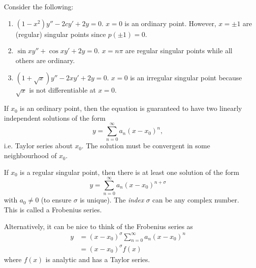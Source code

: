\documentclass[a4paper]{article}
\begin{document}
\begin{eg}
  Consider the following:
  \begin{enumerate}
  \item $(1 - x^2)y'' - 2cy' + 2y = 0$. $x = 0$ is an ordinary point. However, $x = \pm 1$ are (regular) singular points since $p(\pm 1) = 0$.
  \item $\sin x y'' + \cos x y' + 2y = 0$. $x = n\pi$ are regular singular points while all others are ordinary.
  \item $(1 + \sqrt{x}) y'' - 2xy' + 2y = 0$. $x = 0$ is an irregular singular point because $\sqrt{x}$ is not differentiable at $x = 0$.
  \end{enumerate}
\end{eg}

If $x_0$ is an ordinary point, then the equation is guaranteed to have two linearly independent solutions of the form 
\[
y = \sum_{n = 0}^\infty a_n(x - x_0)^n,
\]
i.e. Taylor series about $x_0$. The solution must be convergent in some neighbourhood of $x_0$.

If $x_0$ is a regular singular point, then there is at least one solution of the form 
\[
y = \sum_{n = 0}^\infty a_n(x - x_0)^{n + \sigma}
\]
with $a_0 \not= 0$ (to ensure $\sigma$ is unique). The \emph{index} $\sigma$ can be any complex number. This is called a Frobenius series.

Alternatively, it can be nice to think of the Frobenius series as 
\begin{align*}
  y &= (x - x_0)^\sigma \sum_{n = 0}^\infty a_n (x - x_0)^n\\
  &= (x-x_0)^\sigma f(x)
\end{align*}
where $f(x)$ is analytic and has a Taylor series.
\end{document}

